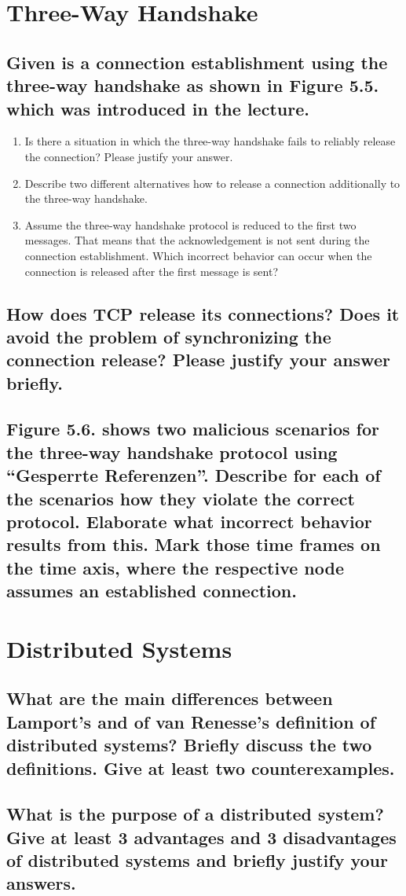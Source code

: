 \documentclass[a4paper,
			llpt,
			solution,
			accentcolor=tud2d,
			colorbacktitle
			]
			{tudexercise}
\begin{document}
\section{Three-Way Handshake}
\subsection{Given is a connection establishment using the three-way handshake as shown in Figure 5.5. which was introduced in the lecture.}
\begin{enumerate}
\item Is there a situation in which the three-way handshake fails to reliably release the connection?
Please justify your answer.
\item Describe two different alternatives how to release a connection additionally to the three-way
handshake.
\item Assume the three-way handshake protocol is reduced to the first two messages. That means
that the acknowledgement is not sent during the connection establishment. Which incorrect
behavior can occur when the connection is released after the first message is sent?
\end{enumerate}
\subsection{How does TCP release its connections? Does it avoid the problem of synchronizing the connection release? Please justify your answer briefly.}
\subsection{Figure 5.6. shows two malicious scenarios for the three-way handshake protocol using “Gesperrte Referenzen”. Describe for each of the scenarios how they violate the correct protocol. Elaborate what incorrect behavior results from this. Mark those time frames on the time axis, where the respective node assumes an established connection.}
\section{Distributed Systems}
\subsection{What are the main differences between Lamport’s and of van Renesse’s definition of distributed systems? Briefly discuss the two definitions. Give at least two counterexamples.}
\subsection{What is the purpose of a distributed system? Give at least 3 advantages and 3 disadvantages of distributed systems and briefly justify your answers.}
\end{document}
